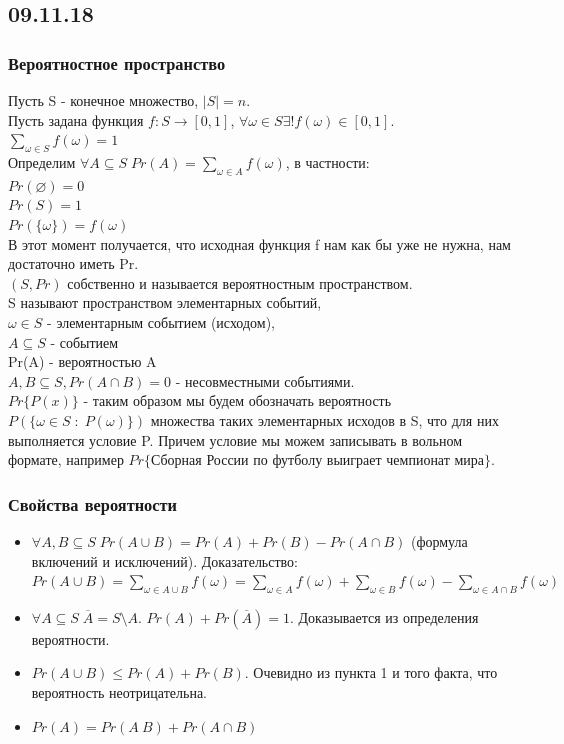 \subsection{09.11.18}
\subsubsection{Вероятностное пространство}
Пусть S - конечное множество, $|S| = n$.\\
Пусть задана функция $f: S \rightarrow [0, 1]$, $\forall \omega \in S \exists ! f(\omega) \in [0, 1]$.\\
$\sum\limits_{\omega \in S} f(\omega) = 1$\\
Определим $\forall A \subseteq S \; Pr(A) = \sum\limits_{\omega \in A} f(\omega)$, в частности:\\
$Pr(\varnothing) = 0$\\
$Pr(S) = 1$\\
$Pr(\{\omega\}) = f(\omega)$\\
В этот момент получается, что исходная функция f нам как бы уже не нужна, нам достаточно иметь Pr.\\
$(S, Pr)$ собственно и называется вероятностным пространством.\\
S называют пространством элементарных событий,\\
$\omega \in S$ - элементарным событием (исходом),\\
$A \subseteq S$ - событием\\
Pr(A) - вероятностью A\\
$A, B \subseteq S, Pr(A \cap B) = 0$ - несовместными событиями.\\
$Pr\{P(x)\}$ - таким образом мы будем обозначать вероятность $P(\{\omega \in S \; : \; P(\omega)\})$ множества таких элементарных исходов в S, что для них выполняется условие P. Причем условие мы можем записывать в вольном формате, например $Pr\{$Сборная России по футболу выиграет чемпионат мира$\}$.
\subsubsection{Свойства вероятности}
\begin{itemize}
\item $\forall A, B \subseteq S \; Pr(A \cup B) = Pr(A) + Pr(B) - Pr(A \cap B)$ (формула включений и исключений). Доказательство: $Pr(A \cup B) = \sum\limits_{\omega \in A \cup B} f(\omega) = \sum\limits_{\omega \in A} f(\omega) + \sum\limits_{\omega \in B} f(\omega) - \sum\limits_{\omega \in A \cap B} f(\omega)$\\
\item $\forall A \subseteq S \; \overline{A} = S \setminus A$. $Pr(A) + Pr(\overline{A}) = 1$. Доказывается из определения вероятности. \\
\item $Pr(A \cup B) \leq Pr(A) + Pr(B)$. Очевидно из пункта 1 и того факта, что вероятность неотрицательна.\\
\item $Pr(A) = Pr(A \ B) + Pr(A \cap B)$
\end{itemize}
